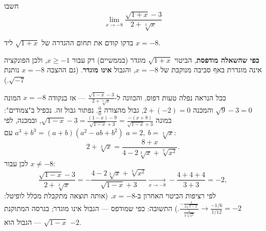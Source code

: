 
\begin{question}
חשבו
\[ \lim_{x\longrightarrow-8}\frac{\sqrt{1+x}-3}{2+\sqrt[3]{x}} \]
\end{question}

\begin{hint}
בדקו קודם את תחום ההגדרה של $\sqrt{1+x}$ ליד $x=-8$.
\end{hint}

\begin{solution}
\textbf{כפי שהשאלה מודפסת}, הביטוי $\sqrt{1+x}$ מוגדר (בממשיים) רק עבור $x\ge-1$, ולכן הפונקציה אינה מוגדרת באף סביבה מנוקבת של $x=-8$, והגבול \textbf{אינו מוגדר}. (גם ההצבה $x=-8$ נותנת $\sqrt{-7}$.)

ככל הנראה נפלה טעות דפוס, והכוונה ל-$\frac{\sqrt{1-x}-3}{2+\sqrt[3]{x}}$ — אז בנקודה $x=-8$ המונה $\sqrt9-3=0$ והמכנה $2+(-2)=0$, גבול מהצורה $\frac00$. נפתור גבול זה. נכפיל ב"צמודים": במונה $\sqrt{1-x}-3=\frac{(1-x)-9}{\sqrt{1-x}+3}=\frac{-(x+8)}{\sqrt{1-x}+3}$, ובמכנה, לפי $a^3+b^3=(a+b)(a^2-ab+b^2)$ עם $a=2,\ b=\sqrt[3]x$:
\[ 2+\sqrt[3]{x}=\frac{8+x}{4-2\sqrt[3]{x}+\sqrt[3]{x^2}}. \]
לכן עבור $x\neq-8$:
\[ \frac{\sqrt{1-x}-3}{2+\sqrt[3]{x}}=-\frac{4-2\sqrt[3]{x}+\sqrt[3]{x^2}}{\sqrt{1-x}+3}\xrightarrow[x\to-8]{}-\frac{4+4+4}{3+3}=-2, \]
לפי רציפות הביטוי האחרון ב-$x=-8$. (אותה תוצאה מתקבלת מכלל לופיטל: $\frac{-\frac{1}{2\sqrt{1-x}}}{\frac{1}{3\sqrt[3]{x^2}}}\to\frac{-1/6}{1/12}=-2$.)
התשובה: כפי שמודפס — הגבול אינו מוגדר; בגרסה המתוקנת $\sqrt{1-x}$ — הגבול הוא $\boxed{-2}$.
\end{solution}
